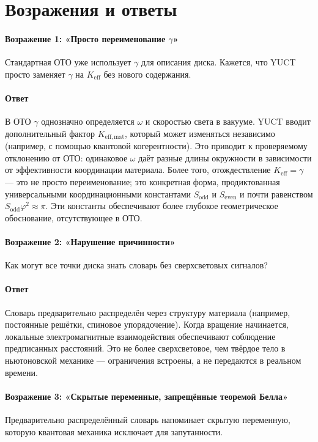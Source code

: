 \documentclass[12pt,a4paper]{article}
\newcommand{\Sodd}{S_{\mathrm{odd}}}
\newcommand{\Seven}{S_{\mathrm{even}}}
\begin{document}
	\section{Возражения и ответы}
	\label{sec:objections}
	
	\paragraph{Возражение 1: «Просто переименование \(\gamma\)»}
	Стандартная ОТО уже использует \(\gamma\) для описания диска. Кажется, что YUCT просто заменяет \(\gamma\) на \(K_{\mathrm{eff}}\) без нового содержания.
	
	\paragraph{Ответ}
	В ОТО \(\gamma\) однозначно определяется \(\omega\) и скоростью света в вакууме. YUCT вводит дополнительный фактор \(K_{\mathrm{eff,mat}}\), который может изменяться независимо (например, с помощью квантовой когерентности). Это приводит к проверяемому отклонению от ОТО: одинаковое \(\omega\) даёт разные длины окружности в зависимости от эффективности координации материала. Более того, отождествление \(K_{\mathrm{eff}} = \gamma\) — это не просто переименование; это конкретная форма, продиктованная универсальными координационными константами \(\Sodd\) и \(\Seven\) и почти равенством \(\Sodd \varphi^2 \approx \pi\). Эти константы обеспечивают более глубокое геометрическое обоснование, отсутствующее в ОТО.
	
	\paragraph{Возражение 2: «Нарушение причинности»}
	Как могут все точки диска знать словарь без сверхсветовых сигналов?
	
	\paragraph{Ответ}
	Словарь предварительно распределён через структуру материала (например, постоянные решётки, спиновое упорядочение). Когда вращение начинается, локальные электромагнитные взаимодействия обеспечивают соблюдение предписанных расстояний. Это не более сверхсветовое, чем твёрдое тело в ньютоновской механике — ограничения встроены, а не передаются в реальном времени.
	
	\paragraph{Возражение 3: «Скрытые переменные, запрещённые теоремой Белла»}
	Предварительно распределённый словарь напоминает скрытую переменную, которую квантовая механика исключает для запутанности.
	
\end{document}
